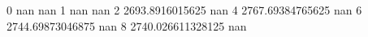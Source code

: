 0 nan nan
1 nan nan
2 2693.8916015625 nan
4 2767.69384765625 nan
6 2744.69873046875 nan
8 2740.026611328125 nan
